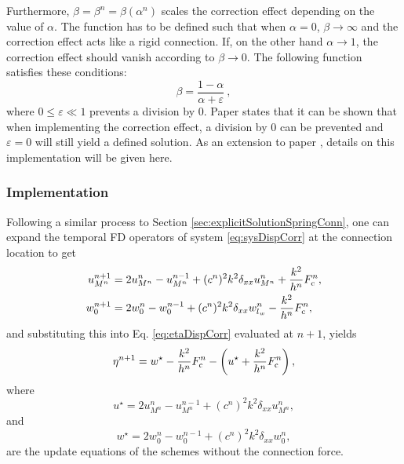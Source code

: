 Furthermore, $\beta = \beta^n = \beta(\alpha^n)$ scales the correction effect depending on the value of $\alpha$. The function has to be defined such that when $\alpha = 0$, $\beta\rightarrow \infty$ and the correction effect acts like a rigid connection. If, on the other hand $\alpha \rightarrow 1$, the correction effect should vanish according to $\beta \rightarrow 0$. The following function satisfies these conditions:
\begin{equation}\label{eq:betaDef}
    \beta  = \frac{1-\alpha}{\alpha + \varepsilon}\ ,
\end{equation}
where $0\leq\varepsilon \ll 1$ prevents a division by 0. Paper \citeP[G] states that it can be shown that when implementing the correction effect, a division by 0 can be prevented and $\varepsilon = 0$ will still yield a defined solution. As an extension to paper \citeP[G], details on this implementation will be given here.

\subsubsection{Implementation}
Following a similar process to Section \ref{sec:explicitSolutionSpringConn}, one can expand the temporal FD operators of system \eqref{eq:sysDispCorr} at the connection location to get
\begin{subequations}\label{eq:sysDispCorrNp1}
    \begin{align}
        u_{M^n}^{n+1} &= 2u_{M^n}^{n} - u_{M^n}^{n-1} + (c^n)^2k^2\delta_{xx}u_{M^n}^{n}+ \frac{k^2}{h^n}
        F_\text{c}^n,\\
        w_{0}^{n+1} &= 2w_{0}^{n} - w_0^{n-1} + (c^n)^2k^2\delta_{xx}w_{l_w}^n - \frac{k^2}{h^n}
        F_\text{c}^n,
    \end{align}
\end{subequations}
and substituting this into Eq. \eqref{eq:etaDispCorr} evaluated at $n+1$, yields
\begin{equation}\label{eq:etaNextDispCorr1}
    \eta^{n+1} = w^\star-\frac{k^2}{h^n}F_{\text{c}}^n-\left(u^\star+\frac{k^2}{h^n}F_{\text{c}}^n\right),
\end{equation}
where 
\begin{equation*}
    u^\star = 2u_{M^n}^{n} - u_{M^n}^{n-1} + (c^n)^2k^2\delta_{xx}u_{M^n}^{n},
\end{equation*} 
and 
\begin{equation*}
    w^\star = 2w_{0}^{n} - w_0^{n-1} + (c^n)^2k^2\delta_{xx}w_0^n ,
\end{equation*}
are the update equations of the schemes without the connection force. 

